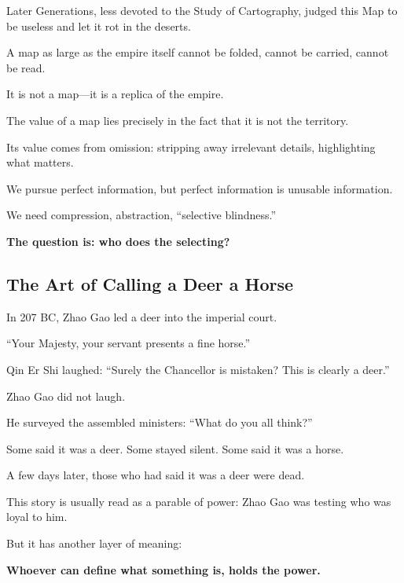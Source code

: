 Later Generations, less devoted to the Study of Cartography, judged this Map to be useless and let it rot in the deserts.

\vspace{1em}

A map as large as the empire itself cannot be folded, cannot be carried, cannot be read.

It is not a map---it is a replica of the empire.

The value of a map lies precisely in the fact that it is not the territory.

Its value comes from omission: stripping away irrelevant details, highlighting what matters.

\vspace{1em}

We pursue perfect information, but perfect information is unusable information.

We need compression, abstraction, ``selective blindness.''

\vspace{1em}

\textbf{The question is: who does the selecting?}

\newpage
\subsection{The Art of Calling a Deer a Horse}

In 207 BC, Zhao Gao led a deer into the imperial court.

``Your Majesty, your servant presents a fine horse.''

Qin Er Shi laughed: ``Surely the Chancellor is mistaken? This is clearly a deer.''

\vspace{1em}

Zhao Gao did not laugh.

He surveyed the assembled ministers: ``What do you all think?''

Some said it was a deer. Some stayed silent. Some said it was a horse.

A few days later, those who had said it was a deer were dead.

This story is usually read as a parable of power: Zhao Gao was testing who was loyal to him.

\vspace{1em}

But it has another layer of meaning:

\textbf{Whoever can define what something is, holds the power.}

